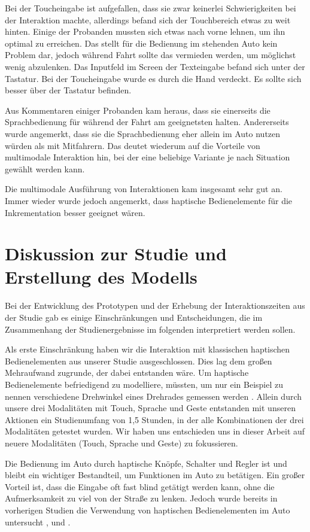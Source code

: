 Bei der Toucheingabe ist aufgefallen, dass sie zwar keinerlei Schwierigkeiten bei der Interaktion machte, allerdings befand sich der Touchbereich etwas zu weit hinten. Einige der Probanden mussten sich etwas nach vorne lehnen, um ihn optimal zu erreichen. Das stellt für die Bedienung im stehenden Auto kein Problem dar, jedoch während Fahrt sollte das vermieden werden, um möglichst wenig abzulenken. Das Inputfeld im Screen der Texteingabe befand sich unter der Tastatur. Bei der Toucheingabe wurde es durch die Hand verdeckt. Es sollte sich besser über der Tastatur befinden. 

Aus Kommentaren einiger Probanden kam heraus, dass sie einerseits die Sprachbedienung für während der Fahrt am geeignetsten halten. Andererseits wurde angemerkt, dass sie die Sprachbedienung eher allein im Auto nutzen würden als mit Mitfahrern. Das deutet wiederum auf die Vorteile von multimodale Interaktion hin, bei der eine beliebige Variante je nach Situation gewählt werden kann.

Die multimodale Ausführung von Interaktionen kam insgesamt sehr gut an. Immer wieder wurde jedoch angemerkt, dass haptische Bedienelemente für die Inkrementation besser geeignet wären. 

\section[Diskussion]{Diskussion zur Studie und Erstellung des Modells}
Bei der Entwicklung des Prototypen und der Erhebung der Interaktionszeiten aus der Studie gab es einige Einschränkungen und Entscheidungen, die im Zusammenhang der Studienergebnisse im folgenden interpretiert werden sollen.

Als erste Einschränkung haben wir die Interaktion mit klassischen haptischen Bedienelementen aus unserer Studie ausgeschlossen. Dies lag dem großen Mehraufwand zugrunde, der dabei entstanden wäre. Um haptische Bedienelemente befriedigend zu modelliere, müssten, um nur ein Beispiel zu nennen verschiedene Drehwinkel eines Drehrades gemessen werden \citep{schneegass_2009}. Allein durch unsere drei Modalitäten mit Touch, Sprache und Geste entstanden mit unseren Aktionen ein Studienumfang von 1,5 Stunden, in der alle Kombinationen der drei Modalitäten getestet wurden. Wir haben uns entschieden uns in dieser Arbeit auf neuere Modalitäten (Touch, Sprache und Geste) zu fokussieren. 

Die Bedienung im Auto durch haptische Knöpfe, Schalter und Regler ist und bleibt ein wichtiger Bestandteil, um Funktionen im Auto zu betätigen. Ein großer Vorteil ist, dass die Eingabe oft fast blind getätigt werden kann, ohne die Aufmerksamkeit zu viel von der Straße zu lenken. Jedoch wurde bereits in vorherigen Studien die Verwendung von haptischen Bedienelementen im Auto untersucht \citep{Pettitt_2007}, \citep{schneegass_2009} und \citep{SchneegaB_2011}. 

